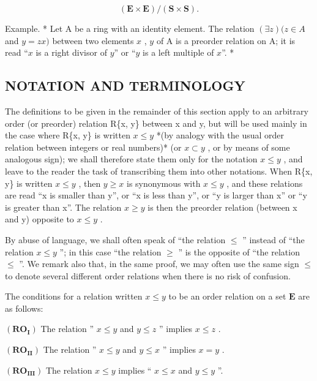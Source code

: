 \[
(\mathbf {E} \times \mathbf {E}) / (\mathbf {S} \times \mathbf {S}).
\]

Example. * Let A be a ring with an identity element. The relation \((\exists z)(z \in A\) and \(y = zx)\) between two elements \(x\) , \(y\) of A is a preorder relation on A; it is read ``\(x\) is a right divisor of \(y\)'' or ``\(y\) is a left multiple of \(x\)''. *

\subsection{NOTATION AND TERMINOLOGY}

The definitions to be given in the remainder of this section apply to an arbitrary order (or preorder) relation R\{x, y\} between x and y, but will be used mainly in the case where R\{x, y\} is written \(x \leqslant y\) *(by analogy with the usual order relation between integers or real numbers)* (or \(x \subset y\) , or by means of some analogous sign); we shall therefore state them only for the notation \(x \leqslant y\) , and leave to the reader the task of transcribing them into other notations. When R\{x, y\} is written \(x \leqslant y\) , then \(y \geqslant x\) is synonymous with \(x \leqslant y\) , and these relations are read ``x is smaller than y'', or ``x is less than y'', or ``y is larger than x'' or ``y is greater than x''. The relation \(x \geqslant y\) is then the preorder relation (between x and y) opposite to \(x \leqslant y\) .

By abuse of language, we shall often speak of ``the relation \(\leqslant\) '' instead of ``the relation \(x \leqslant y\) ''; in this case ``the relation \(\geqslant\) '' is the opposite of ``the relation \(\leqslant\) ''. We remark also that, in the same proof, we may often use the same sign \(\leqslant\) to denote several different order relations when there is no risk of confusion.

The conditions for a relation written \(x \leqslant y\) to be an order relation on a set \(\mathbf{E}\) are as follows:

\((\mathbf{RO}_{\mathbf{I}})\) The relation '' \(x \leqslant y\) and \(y \leqslant z\) '' implies \(x \leqslant z\) .

\((\mathbf{RO}_{\mathbf{II}})\) The relation '' \(x \leqslant y\) and \(y \leqslant x\) '' implies \(x = y\) .

\((\mathbf{RO}_{\mathbf{III}})\) The relation \(x \leqslant y\) implies `` \(x \leqslant x\) and \(y \leqslant y\) ''.

